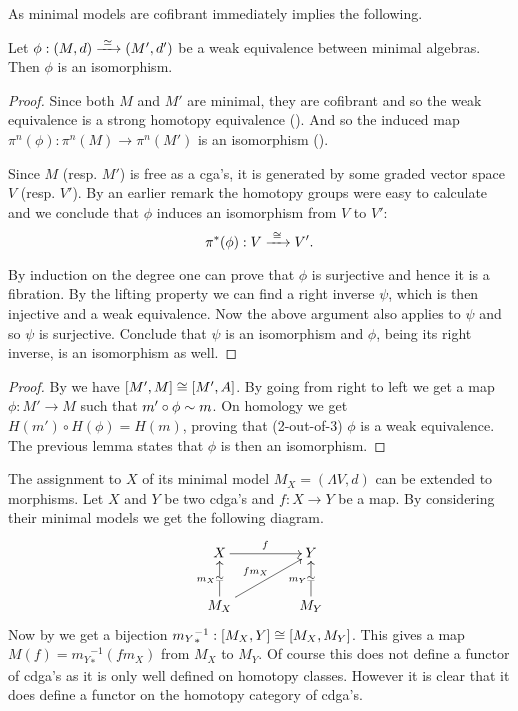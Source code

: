 As minimal models are cofibrant  immediately implies the following.


\begin{lemma}
	Let $\phi: (M, d) \xrightarrow{\,\,{\simeq}\,\,} (M', d')$ be a weak equivalence between minimal algebras. Then $\phi$ is an isomorphism.
\end{lemma}
\begin{proof}
	Since both $M$ and $M'$ are minimal, they are cofibrant and so the weak equivalence is a strong homotopy equivalence (). And so the induced map $\pi^n(\phi) : \pi^n(M) \to \pi^n(M')$ is an isomorphism ().

	Since $M$ (resp. $M'$) is free as a cga's, it is generated by some graded vector space $V$ (resp. $V'$). By an earlier remark the homotopy groups were easy to calculate and we conclude that $\phi$ induces an isomorphism from $V$ to $V'$:
	\[ \pi^\ast(\phi) : V \xrightarrow{\,\,{\cong}\,\,} V'. \]

	By induction on the degree one can prove that $\phi$ is surjective and hence it is a fibration. By the lifting property we can find a right inverse $\psi$, which is then injective and a weak equivalence. Now the above argument also applies to $\psi$ and so $\psi$ is surjective. Conclude that $\psi$ is an isomorphism and $\phi$, being its right inverse, is an isomorphism as well.
\end{proof}

\begin{proof}
	By  we have $[M', M] \cong [M', A]$. By going from right to left we get a map $\phi: M' \to M$ such that $m' \circ \phi \sim m$. On homology we get $H(m') \circ H(\phi) = H(m)$, proving that (2-out-of-3) $\phi$ is a weak equivalence. The previous lemma states that $\phi$ is then an isomorphism.
\end{proof}

The assignment to $X$ of its minimal model $M_X = (\Lambda V, d)$ can be extended to morphisms. Let $X$ and $Y$ be two cdga's and $f: X \to Y$ be a map. By considering their minimal models we get the following diagram.
\begin{displaymath}
	\xymatrix @C=1.5cm{
	X \ar[r]^f & Y \\
	M_X \arwe[u]^{m_X} \ar[ur]^{f m_X} & M_Y \arwe[u]^{m_Y}
	}
\end{displaymath}
Now by  we get a bijection ${m_Y}_\ast^{-1} : [M_X, Y] \cong [M_X, M_Y]$. This gives a map $M(f) = {m_Y}_\ast^{-1} (f m_X)$ from $M_X$ to $M_Y$. Of course this does not define a functor of cdga's as it is only well defined on homotopy classes. However it is clear that it does define a functor on the homotopy category of cdga's.

